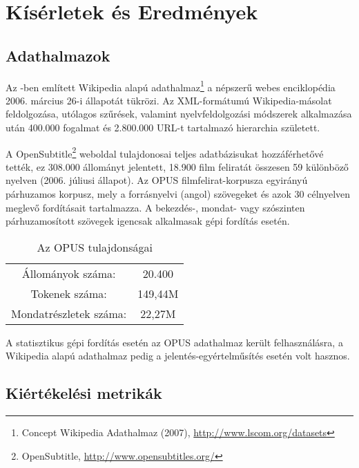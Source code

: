 \section{Kísérletek és Eredmények} \label{sec:results}

\subsection{Adathalmazok}

Az \cite{Gabrilovich:2007:CSR}-ben említett Wikipedia alapú adathalmaz\footnote{Concept Wikipedia Adathalmaz (2007),  \url{http://www.lscom.org/datasets}} a népszerű webes enciklopédia 2006. március 26-i állapotát tükrözi. Az XML-formátumú Wikipedia-másolat feldolgozása, utólagos szűrések, valamint nyelvfeldolgozási módszerek alkalmazása után 400.000 fogalmat és 2.800.000 URL-t tartalmazó hierarchia született. 

A OpenSubtitle\footnote{OpenSubtitle, \url{http://www.opensubtitles.org/}} weboldal tulajdonosai teljes adatbázisukat hozzáférhetővé tették, ez 308.000 állományt jelentett, 18.900 film feliratát összesen 59 különböző nyelven (2006. júliusi állapot). Az OPUS filmfelirat-korpusza \cite{Tiedemann:RANLP5} egyirányú párhuzamos korpusz, mely a forrásnyelvi (angol) szövegeket és azok 30 célnyelven meglevő fordításait tartalmazza. A bekezdés-, mondat- vagy szószinten párhuzamosított szövegek igencsak alkalmasak gépi fordítás esetén.

\begin{table}[h!]
\centering
\normalsize
 \begin{tabular}{| c | c |} 
 \hline\hline
 Állományok száma: & 20.400 \\ [1ex]
 
 Tokenek száma: & 149,44M \\ [1ex]
 
  Mondatrészletek száma: & 22,27M  \\ [1ex] 
 \hline
 \end{tabular}
 \caption{Az OPUS tulajdonságai}
\end{table}

A statisztikus gépi fordítás esetén az OPUS adathalmaz került felhasználásra, a Wikipedia alapú adathalmaz pedig a jelentés-egyértelműsítés esetén volt hasznos.

\subsection{Kiértékelési metrikák}


